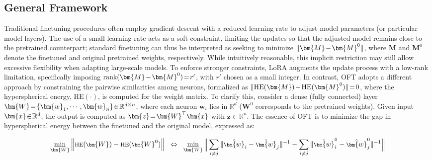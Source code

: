 \subsection{General Framework}

Traditional finetuning procedures often employ gradient descent with a reduced learning rate to adjust model parameters (or particular model layers). The use of a small learning rate acts as a soft constraint, limiting the updates so that the adjusted model remains close to the pretrained counterpart; standard finetuning can thus be interpreted as seeking to minimize $\thickmuskip=2mu \medmuskip=2mu \| \bm{M} - \bm{M}^0\|$, where $\bm{M}$ and $\bm{M}^0$ denote the finetuned and original pretrained weights, respectively. While intuitively reasonable, this implicit restriction may still allow excessive flexibility when adapting large-scale models. To enforce stronger constraints, LoRA augments the update process with a low-rank limitation, specifically imposing $\thickmuskip=2mu \medmuskip=2mu \text{rank}(\bm{M} - \bm{M}^0)=r'$, with $r'$ chosen as a small integer. In contrast, OFT adopts a different approach by constraining the pairwise similarities among neurons, formalized as $\thickmuskip=2mu \medmuskip=2mu \| \text{HE}(\bm{M})-\text{HE}(\bm{M}^0) \|=0$, where the hyperspherical energy, $\text{HE}(\cdot)$, is computed for the weight matrix. To clarify this, consider a dense (fully connected) layer $\thickmuskip=2mu \medmuskip=2mu \bm{W}=\{\bm{w}_1,\cdots,\bm{w}_n\}\in\mathbb{R}^{d\times n}$, where each neuron $\bm{w}_i$ lies in $\mathbb{R}^{d}$ ($\bm{W}^0$ corresponds to the pretrained weights). Given input $\thickmuskip=2mu \medmuskip=2mu \bm{x}\in\mathbb{R}^d$, the output is computed as $\thickmuskip=2mu \medmuskip=2mu \bm{z}=\bm{W}^\top\bm{x}$ with $\bm{z}\in\mathbb{R}^n$. The essence of OFT is to minimize the gap in hyperspherical energy between the finetuned and the original model, expressed as:

\begin{equation}\label{eq:oft_principle}
\footnotesize
\min_{\bm{W}} \left\| \text{HE}(\bm{W})-\text{HE}(\bm{W}^0)\right\|~~\Leftrightarrow~~\min_{\bm{W}} \bigg{\|} \sum_{i\neq j} \|\hat{\bm{w}}_i-\hat{\bm{w}}_j\|^{-1}-\sum_{i\neq j} \|\hat{\bm{w}}^0_i-\hat{\bm{w}}^0_j\|^{-1}\bigg{\|}
\end{equation}

